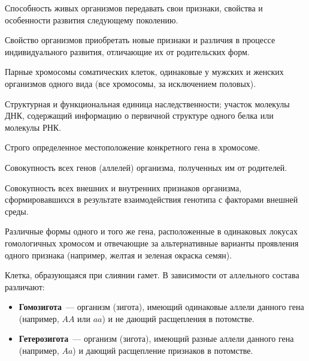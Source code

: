 \documentclass[12pt]{article}
\begin{document}
	\begin{definition}[Наследственность]
		Способность живых организмов передавать свои признаки, свойства и особенности развития следующему поколению.
	\end{definition}
	
	\begin{definition}[Изменчивость]
		Свойство организмов приобретать новые признаки и различия в процессе индивидуального развития, отличающие их от родительских форм.
	\end{definition}
	
	\begin{definition}[Аутосомы]
		Парные хромосомы соматических клеток, одинаковые у мужских и женских организмов одного вида (все хромосомы, за исключением половых).
	\end{definition}
	
	\begin{definition}[Ген]
		Структурная и функциональная единица наследственности; участок молекулы ДНК, содержащий информацию о первичной структуре одного белка или молекулы РНК.
	\end{definition}
	
	\begin{definition}[Локус]
		Строго определенное местоположение конкретного гена в хромосоме.
	\end{definition}
	
	\begin{definition}[Генотип]
		Совокупность всех генов (аллелей) организма, полученных им от родителей.
	\end{definition}
	
	\begin{definition}[Фенотип]
		Совокупность всех внешних и внутренних признаков организма, сформировавшихся в результате взаимодействия генотипа с факторами внешней среды.
	\end{definition}
	
	\begin{definition}[Аллели]
		Различные формы одного и того же гена, расположенные в одинаковых локусах гомологичных хромосом и отвечающие за альтернативные варианты проявления одного признака (например, желтая и зеленая окраска семян).
	\end{definition}
	
	\begin{definition}
		Клетка, образующаяся при слиянии гамет. В зависимости от аллельного состава различают:
		
		\begin{itemize}
			\item \textbf{Гомозигота}~--- организм (зигота), имеющий одинаковые аллели данного гена (например, $AA$ или $aa$) и не дающий расщепления в потомстве.
			
			\item \textbf{Гетерозигота}~--- организм (зигота), имеющий разные аллели данного гена (например, $Aa$) и дающий расщепление признаков в потомстве.
		\end{itemize}
	\end{definition}
	
\end{document}
